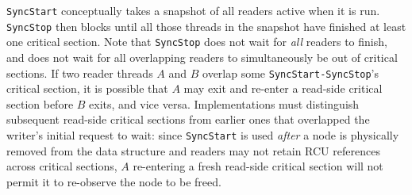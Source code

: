 \lstinline|SyncStart| conceptually takes a snapshot of all readers active when it is run.
\lstinline|SyncStop| then blocks until all those threads in the snapshot have finished at least one critical section.
Note that \lstinline|SyncStop| does not wait for \emph{all} readers to finish, and does not wait for all overlapping readers to simultaneously be out of critical sections.  If two reader threads $A$ and $B$ overlap some \texttt{SyncStart-SyncStop}'s critical section, it is possible that $A$ may exit and re-enter a read-side critical section before $B$ exits, and vice versa.  Implementations must distinguish subsequent read-side critical sections from earlier ones that overlapped the writer's initial request to wait: since \lstinline|SyncStart| is used \emph{after} a node is physically removed from the data structure and readers may not retain RCU references across critical sections, $A$ re-entering a fresh read-side critical section will not permit it to re-observe the node to be freed.

